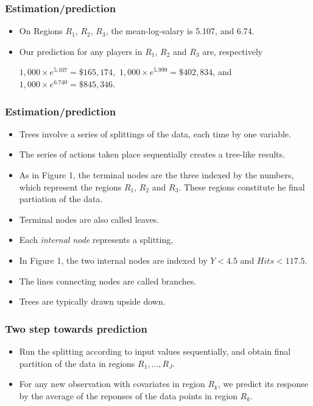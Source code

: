 \documentclass{beamer}
\begin{document}
 

  \begin{frame}
    \frametitle{Estimation/prediction}
    \begin{itemize}
       \item On Regions $R_1$, $R_2$, $R_3$, the mean-log-salary is 
       5.107, and 6.74. 
       \item Our prediction for any players in $R_1$, $R_2$ and $R_3$ are, respectively
       
       $1,000 \times e^{ 5.107}=\$165,174,$ 
       $1,000\times e^{ 5.999 }=\$402,834 $, and 
       $1,000\times e^{6.740 } =\$845,346 $.
       
                 		
                 	\end{itemize}
                 \end{frame}  
       
    
    \begin{frame}
    	\frametitle{Estimation/prediction}
    	\begin{itemize}   
      \item  Trees involve a series of splittings of the data, each time by one variable.
       \item  The series of actions taken place sequentially creates a tree-like results.
      \item  As in Figure 1, the terminal nodes are the three indexed by the numbers, which represent
      the 
      regions $R_1$, $R_2$ and $R_3$. These regions constitute he final partiation of the data. 
       \item  Terminal nodes are also called leaves.
       \item  Each {\it internal node}    represents a splitting, 
       \item In Figure 1, the two internal nodes are indexed by $Y<4.5$ and $Hits <117.5$.  
        \item The lines connecting nodes are called branches.
        \item Trees are typically drawn upside down.     		
    \end{itemize}
  \end{frame} 
  
  \begin{frame}
  	\frametitle{ Two step towards prediction}
  	\begin{itemize}
  		\item 
  	  Run the splitting according to input values sequentially, and obtain final partition of the data in regions
  	  $R_1, ..., R_J$. 
  		
  		\item For any new observation with covariates in region $R_k$, we predict its response 
  		by the average of the reponses of the data points in region $R_k$. 
  		 
  		
  	\end{itemize}
  \end{frame} 
  
\end{document}
